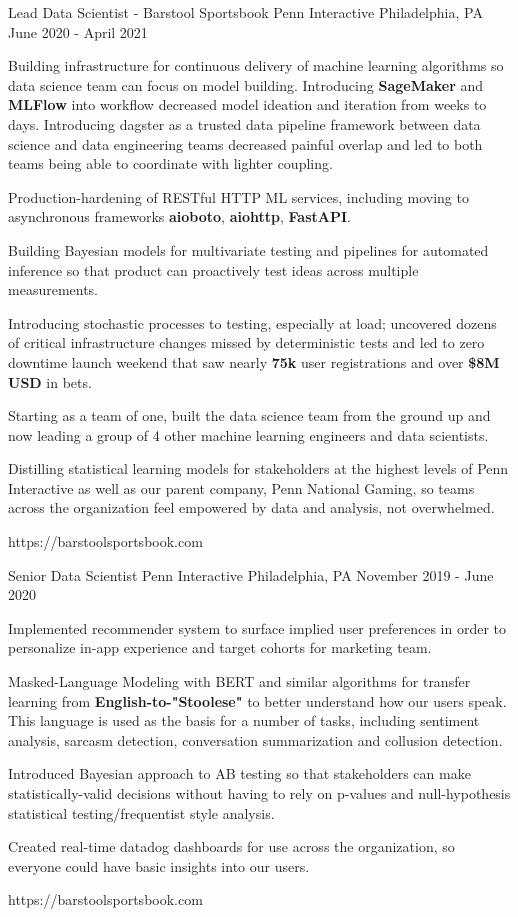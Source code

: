 \begin{cventries}
\cventrylink
{Lead Data Scientist - Barstool Sportsbook}
{Penn Interactive}
{Philadelphia, PA}
{June 2020 - April 2021}
{
\begin{cvitems}
\item{Building infrastructure for continuous delivery of machine learning algorithms so data science team can focus on model building. Introducing \textbf{SageMaker} and \textbf{MLFlow} into workflow decreased model ideation and iteration from weeks to days. Introducing dagster as a trusted data pipeline framework between data science and data engineering teams decreased painful overlap and led to both teams being able to coordinate with lighter coupling.}
\item{Production-hardening of RESTful HTTP ML services, including moving to asynchronous frameworks \textbf{aioboto}, \textbf{aiohttp}, \textbf{FastAPI}.}
\item{Building Bayesian models for multivariate testing and pipelines for automated inference so that product can proactively test ideas across multiple measurements.}
\item{Introducing stochastic processes to testing, especially at load; uncovered dozens of critical infrastructure changes missed by deterministic tests and led to zero downtime launch weekend that saw nearly \textbf{75k} user registrations and over \textbf{\$8M USD} in bets.}
\item{Starting as a team of one, built the data science team from the ground up and now leading a group of 4 other machine learning engineers and data scientists.}
\item{Distilling statistical learning models for stakeholders at the highest levels of Penn Interactive as well as our parent company, Penn National Gaming, so teams across the organization feel empowered by data and analysis, not overwhelmed.}
\end{cvitems}
}
{https://barstoolsportsbook.com}


\cventrylink
{Senior Data Scientist}
{Penn Interactive}
{Philadelphia, PA}
{November 2019 - June 2020}
{ %
\begin{cvitems}
\item{Implemented recommender system to surface implied user preferences in order to personalize in-app experience and target cohorts for marketing team.}
\item{Masked-Language Modeling with BERT and similar algorithms for transfer learning from \textbf{English-to-"Stoolese"} to better understand how our users speak. This language is used as the basis for a number of tasks, including sentiment analysis, sarcasm detection, conversation summarization and collusion detection.}
\item{Introduced Bayesian approach to AB testing so that stakeholders can make statistically-valid decisions without having to rely on p-values and null-hypothesis statistical testing/frequentist style analysis.}
\item{Created real-time datadog dashboards for use across the organization, so everyone could have basic insights into our users.}
\end{cvitems}
}
{https://barstoolsportsbook.com}


\end{cventries}
